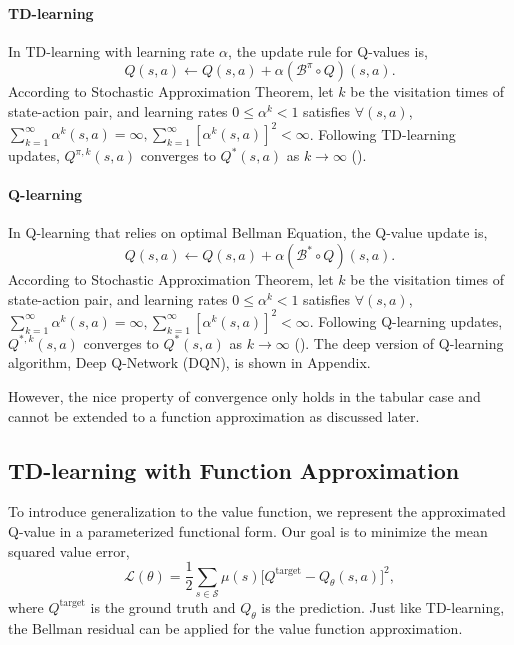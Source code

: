 \documentclass{article} %
\begin{document}
\paragraph{TD-learning} In TD-learning with learning rate $\alpha$, the update rule for Q-values is,
\begin{equation}
Q(s, a) \leftarrow Q(s, a) + \alpha (\mathcal{B}^\pi\circ Q) (s,a). \label{eq:td-learning}
\end{equation}
According to Stochastic Approximation Theorem, let $k$ be the visitation times of state-action pair, and learning rates $0 \leqslant \alpha^k < 1$ satisfies $\forall (s, a)$, $\sum_{k=1}^\infty \alpha^k(s, a) = \infty,\sum_{k=1}^\infty [\alpha^k(s, a)]^2 < \infty$. Following TD-learning updates, $Q^{\pi, k}(s, a)$ converges to $Q^*(s, a)$ as $k \to \infty$ (\cite{jaakkola1994convergence}).

\paragraph{Q-learning} In Q-learning that relies on optimal Bellman Equation, the Q-value update is,
\begin{equation}
Q(s, a) \leftarrow Q(s, a) + \alpha (\mathcal{B}^*\circ Q) (s,a). \label{eq:q-learning}
\end{equation}
According to Stochastic Approximation Theorem, let $k$ be the visitation times of state-action pair, and learning rates $0 \leqslant \alpha^k < 1$ satisfies $\forall (s, a)$, $\sum_{k=1}^\infty \alpha^k(s, a) = \infty, \sum_{k=1}^\infty [\alpha^k(s, a)]^2 < \infty$. Following Q-learning updates, $Q^{*, k}(s, a)$ converges to $Q^*(s, a)$ as $k \to \infty$ (\cite{watkins1992qlearning}). The deep version of Q-learning algorithm, Deep Q-Network (DQN), is shown in Appendix.

However, the nice property of convergence only holds in the tabular case and cannot be extended to a function approximation as discussed later.

\subsection{TD-learning with Function Approximation}

To introduce generalization to the value function, we represent the approximated Q-value in a parameterized functional form. Our goal is to minimize the mean squared value error,
\begin{equation}
    \mathcal{L}(\theta) = \frac{1}{2}\sum_{s \in \mathcal{S}} \mu(s) \Big[ Q^\text{target} - Q_\theta(s, a) \Big]^2,
\end{equation}
where $Q^\text{target}$ is the ground truth and $Q_\theta$ is the prediction. Just like TD-learning, the Bellman residual can be applied for the value function approximation.
\end{document}
